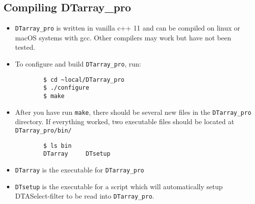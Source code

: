 \documentclass[12pt]{article}
\begin{document}
	\subsection{Compiling DTarray\_pro}

	\begin{itemize}

	\item \texttt{DTarray\_pro} is written in vanilla c++ 11 and can be compiled on linux or macOS systems with gcc. Other compilers may work but have not been tested.

	\item To configure and build \texttt{DTarray\_pro}, run:

	\begin{lstlisting}
		$ cd ~local/DTarray_pro
		$ ./configure
		$ make
	\end{lstlisting}

	\item After you have run \texttt{make}, there should be several new files in the \texttt{DTarray\_pro} directory.  If everything worked, two executable files should be located at \texttt{DTarray\_pro/bin/}
		
	\begin{lstlisting}
		$ ls bin
		DTarray		DTsetup
	\end{lstlisting}
		
	\item \texttt{DTarray} is the executable for \texttt{DTarray\_pro}
		
	\item \texttt{DTsetup} is the executable for a script which will automatically setup DTASelect-filter to be read into \texttt{DTarray\_pro}.

	\end{itemize}



	
	
\end{document}
